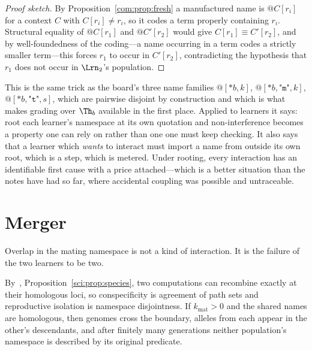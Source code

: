 \begin{proof}[Proof sketch]
By Proposition~\ref{com:prop:fresh} a manufactured name is $@C[r_i]$ for a context $C$ with
$C[r_i] \neq r_i$, so it codes a term properly containing $r_i$. Structural equality of
$@C[r_1]$ and $@C'[r_2]$ would give $C[r_1] \equiv C'[r_2]$, and by well-foundedness of the
coding---a name occurring in a term codes a strictly smaller term---this forces $r_1$ to occur in
$C'[r_2]$, contradicting the hypothesis that $r_1$ does not occur in $\Lrn_2$'s population.
\end{proof}

\begin{remark}\label{com:modularity-purchasable-price-naming}
This is the same trick as the board's three name families $@[*b,k]$, $@[*b,\texttt{"m"},k]$,
$@[*b,\texttt{"t"},s]$, which are pairwise disjoint by construction and which is what makes
grading over $\Th_b$ available in the first place. Applied to learners it says: root each
learner's namespace at its own quotation and non-interference becomes a property one can rely on
rather than one one must keep checking. It also says that a learner which \emph{wants} to
interact must import a name from outside its own root, which is a step, which is metered. Under
rooting, every interaction has an identifiable first cause with a price attached---which is a
better situation than the notes have had so far, where accidental coupling was possible and
untraceable.
\end{remark}

\section{Merger}\label{com:sec:merger}\label{com:S8}

Overlap in the mating namespace is not a kind of interaction. It is the failure of the two
learners to be two.

\begin{proposition}\label{com:mating-overlap-collapses-pair}
By~\chSci, Proposition~\ref{sci:prop:species}, two computations can recombine exactly at their homologous loci, so
conspecificity is agreement of path sets and reproductive isolation is namespace disjointness. If
$k_{\mathrm{mat}} > 0$ and the shared names are homologous, then genomes cross the boundary,
alleles from each appear in the other's descendants, and after finitely many generations neither
population's namespace is described by its original predicate.
\end{proposition}

